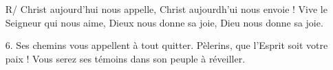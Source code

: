     \begin{itemize}
        \item[R/]
        Christ aujourd'hui nous appelle, Christ aujourdh'ui nous envoie ! Vive le Seigneur qui nous aime, Dieux nous donne sa joie, Dieu nous donne sa joie.
    \item[6.]
    Ses chemins vous appellent à tout quitter. Pèlerins, que l'Esprit soit votre paix ! Vous serez ses témoins dans son peuple à réveiller.
    \end{itemize}
